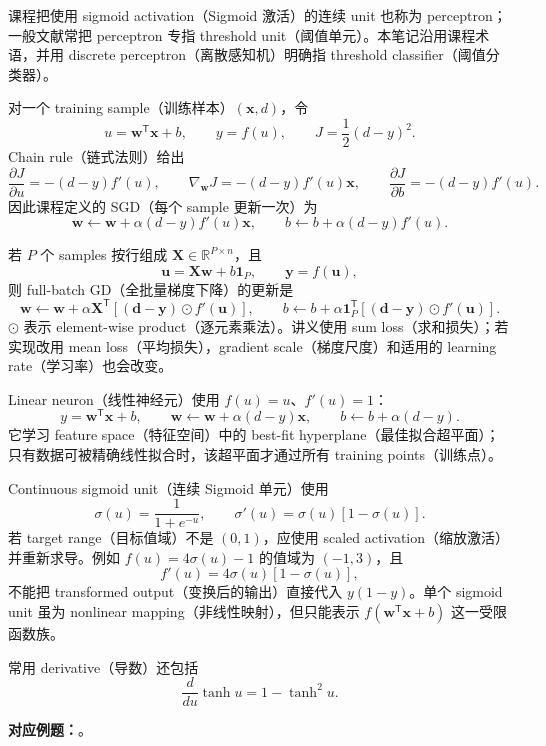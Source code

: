 课程把使用 sigmoid activation（Sigmoid 激活）的连续 unit 也称为 perceptron；一般文献常把 perceptron 专指 threshold unit（阈值单元）。本笔记沿用课程术语，并用 discrete perceptron（离散感知机）明确指 threshold classifier（阈值分类器）。


对一个 training sample（训练样本）$(\bm x,d)$，令
\[
  u=\bm w^{\mathsf T}\bm x+b,\qquad y=f(u),\qquad
  J=\frac12(d-y)^2.
\]
Chain rule（链式法则）给出
\[
  \frac{\partial J}{\partial u}=-(d-y)f'(u),\qquad
  \boxed{\nabla_{\bm w}J=-(d-y)f'(u)\bm x},\qquad
  \boxed{\frac{\partial J}{\partial b}=-(d-y)f'(u)}.
\]
因此课程定义的 SGD（每个 sample 更新一次）为
\[
  \boxed{\bm w\leftarrow\bm w+\alpha(d-y)f'(u)\bm x},\qquad
  \boxed{b\leftarrow b+\alpha(d-y)f'(u)}.
\]

若 $P$ 个 samples 按行组成 $\bm X\in\mathbb R^{P\times n}$，且
\[
  \bm u=\bm X\bm w+b\bm 1_P,\qquad \bm y=f(\bm u),
\]
则 full-batch GD（全批量梯度下降）的更新是
\[
  \boxed{\bm w\leftarrow\bm w+
    \alpha\bm X^{\mathsf T}\!\left[(\bm d-\bm y)\odot f'(\bm u)\right]},
  \qquad
  \boxed{b\leftarrow b+
    \alpha\bm 1_P^{\mathsf T}\!\left[(\bm d-\bm y)\odot f'(\bm u)\right]}.
\]
$\odot$ 表示 element-wise product（逐元素乘法）。讲义使用 sum loss（求和损失）；若实现改用 mean loss（平均损失），gradient scale（梯度尺度）和适用的 learning rate（学习率）也会改变。


Linear neuron（线性神经元）使用 $f(u)=u$、$f'(u)=1$：
\[
  y=\bm w^{\mathsf T}\bm x+b,\qquad
  \bm w\leftarrow\bm w+\alpha(d-y)\bm x,\qquad
  b\leftarrow b+\alpha(d-y).
\]
它学习 feature space（特征空间）中的 best-fit hyperplane（最佳拟合超平面）；只有数据可被精确线性拟合时，该超平面才通过所有 training points（训练点）。

Continuous sigmoid unit（连续 Sigmoid 单元）使用
\[
  \sigma(u)=\frac{1}{1+e^{-u}},\qquad
  \sigma'(u)=\sigma(u)[1-\sigma(u)].
\]
若 target range（目标值域）不是 $(0,1)$，应使用 scaled activation（缩放激活）并重新求导。例如 $f(u)=4\sigma(u)-1$ 的值域为 $(-1,3)$，且
\[
  f'(u)=4\sigma(u)[1-\sigma(u)],
\]
不能把 transformed output（变换后的输出）直接代入 $y(1-y)$。单个 sigmoid unit 虽为 nonlinear mapping（非线性映射），但只能表示 $f(\bm w^{\mathsf T}\bm x+b)$ 这一受限函数族。

常用 derivative（导数）还包括
\[
  \frac{d}{du}\tanh u=1-\tanh^2u.
\]

\textbf{对应例题：}。

